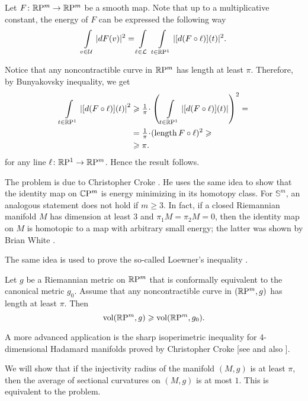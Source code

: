 Let $F\colon\mathbb{R}\mathrm{P}^m\to\mathbb{R}\mathrm{P}^m$ be a smooth map.
Note that up to a multiplicative constant,
the energy of $F$ can be expressed the following way
\[\int\limits_{v\in\mathcal{U}} |dF(v)|^2
=
\int\limits_{\ell\in\mathcal{L}}\ \int\limits_{t\in\mathbb{R}\mathrm{P}^1} |[d(F\circ \ell)](t)|^2.\]

Notice that any noncontractible curve in $\mathbb{R}\mathrm{P}^m$ has length at least $\pi$.
Therefore, by Bunyakovsky inequality, we get
\begin{align*}
\int\limits_{t\in\RP^1} \left|[d(F\circ \ell)](t)\right|^2
&\ge 
\tfrac1\pi\cdot \left(\,\int\limits_{t\in\RP^1} \left|[d(F\circ \ell)](t)\right|\right)^2=
\\
&=\tfrac1\pi\cdot (\length F\circ\ell)^2\ge
\\
&\ge \pi.
\end{align*}
for any line $\ell\colon\mathbb{R}\mathrm{P}^1\to \mathbb{R}\mathrm{P}^m$.
Hence the result follows.\qeds

\label{page:liouville}
The problem is due to Christopher Croke \cite{croke-energy}. 
He uses the same idea to show that the identity map on $\mathbb{C}\mathrm{P}^m$ is energy minimizing in its homotopy class.
For $\mathbb S^m$, an analogous statement does not hold if $m\ge 3$.
In fact, 
if a closed Riemannian manifold $M$ 
has dimension at least 3 
and $\pi_1M=\pi_2M=0$,
then the identity map on $M$ is homotopic 
to a map with arbitrary small energy;
the latter was shown by Brian White \cite{white}.

The same idea is used to prove the so-called Loewner's inequality \cite{gromov-filling}.
\begin{pr}
Let $g$ be a Riemannian metric on $\mathbb{R}\mathrm{P}^m$ that is conformally equivalent to the canonical metric $g_0$.
Assume that any noncontractible curve in $(\mathbb{R}\mathrm{P}^m,g)$ has length at least $\pi$.
Then
\[\operatorname{\rm vol}\nolimits(\mathbb{R}\mathrm{P}^m,g)\geqslant\operatorname{\rm vol}\nolimits(\mathbb{R}\mathrm{P}^m,g_0).\]

\end{pr}

A more advanced application is the sharp isoperimetric inequality for 
4-dimensional Hadamard manifolds proved by Christopher Croke [see  and also ].





We will show that 
if the injectivity radius of the manifold $(M,g)$ is at least $\pi$,
then the average of sectional curvatures on $(M,g)$ is at most $1$.
This is equivalent to the problem.

